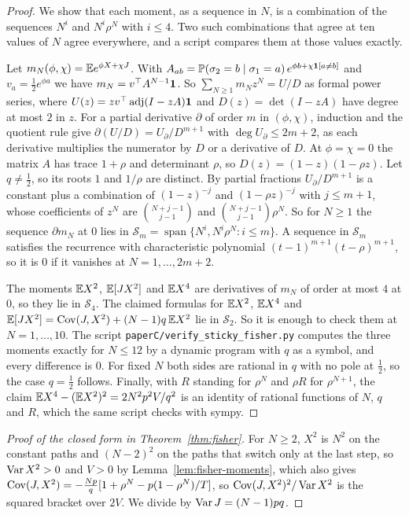 \begin{proof}
We show that each moment, as a sequence in $N$, is a combination of the
sequences $N^i$ and $N^i\rho^N$ with $i\le4$. Two such combinations that agree
at ten values of $N$ agree everywhere, and a script compares them at those
values exactly.

Let $m_N(\phi,\chi)=\mathbb E e^{\phi X+\chi J}$. With
$A_{ab}=\mathbb P(\sigma_2=b\mid\sigma_1=a)\,e^{\phi b+\chi\mathbf 1[a\ne b]}$ and
$v_a=\frac12e^{\phi a}$ we have $m_N=v^\top A^{N-1}\mathbf 1$. So
$\sum_{N\ge1}m_Nz^N=U/D$ as formal power series, where
$U(z)=zv^\top\operatorname{adj}(I-zA)\mathbf 1$ and $D(z)=\det(I-zA)$ have degree
at most $2$ in $z$. For a partial derivative
$\partial$ of order $m$ in $(\phi,\chi)$, induction and the quotient rule give
$\partial(U/D)=U_\partial/D^{m+1}$ with $\deg U_\partial\le2m+2$, as each
derivative multiplies the numerator by $D$ or a derivative of $D$. At
$\phi=\chi=0$ the matrix $A$ has trace $1+\rho$ and determinant $\rho$, so
$D(z)=(1-z)(1-\rho z)$. Let $q\ne\frac12$, so its roots $1$ and
$1/\rho$ are distinct. By partial
fractions $U_\partial/D^{m+1}$ is a constant plus a combination of
$(1-z)^{-j}$ and $(1-\rho z)^{-j}$ with $j\le m+1$, whose coefficients of
$z^N$ are $\binom{N+j-1}{j-1}$ and $\binom{N+j-1}{j-1}\rho^N$. So for $N\ge1$
the sequence $\partial m_N$ at $0$ lies in
$\mathcal S_m=\operatorname{span}\{N^i,N^i\rho^N:i\le m\}$. A sequence in
$\mathcal S_m$ satisfies the recurrence with characteristic polynomial
$(t-1)^{m+1}(t-\rho)^{m+1}$, so it is $0$ if it vanishes at
$N=1,\dots,2m+2$.

The moments $\mathbb E X^2$, $\mathbb E[JX^2]$ and $\mathbb E X^4$ are derivatives of $m_N$ of
order at most $4$ at $0$, so they lie in $\mathcal S_4$. The claimed
formulas for $\mathbb E X^2$, $\mathbb E X^4$ and $\mathbb E[JX^2]=\operatorname{Cov}(J,X^2)+(N-1)q\,\mathbb E X^2$
lie in $\mathcal S_2$. So it is enough to check them at $N=1,\dots,10$. The
script \texttt{paperC/verify\_sticky\_fisher.py} computes the three moments exactly for
$N\le12$ by a dynamic program with $q$ as a symbol, and every difference is
$0$. For fixed $N$ both sides
are rational in $q$ with no pole at $\frac12$, so the case $q=\frac12$
follows. Finally, with $R$ standing for $\rho^N$ and $\rho R$ for
$\rho^{N+1}$, the claim $\mathbb E X^4-(\mathbb E X^2)^2=2N^2p^2V/q^2$ is an identity of
rational functions of $N$, $q$ and $R$, which the same script checks with
sympy.
\end{proof}

\begin{proof}[Proof of the closed form in Theorem~\ref{thm:fisher}]
For $N\ge2$, $X^2$ is $N^2$ on the constant paths and $(N-2)^2$ on the
paths that switch only at the last step, so $\operatorname{Var} X^2>0$ and $V>0$ by
Lemma~\ref{lem:fisher-moments}, which also gives
$\operatorname{Cov}(J,X^2)=-\frac{Np}q[1+\rho^N-p(1-\rho^N)/T]$, so
$\operatorname{Cov}(J,X^2)^2/\operatorname{Var} X^2$ is the squared bracket over $2V$. We divide by
$\operatorname{Var} J=(N-1)pq$.
\end{proof}

